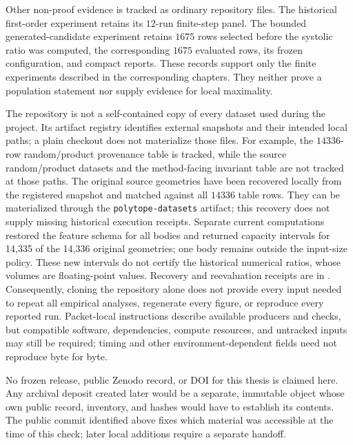 Other non-proof evidence is tracked as ordinary repository files. The
historical first-order experiment retains its
\(12\)-run finite-step panel.  The bounded generated-candidate experiment
retains \(1675\) rows selected before the systolic ratio was computed, the
corresponding \(1675\) evaluated rows, its frozen configuration, and compact
reports.  These records support only the finite experiments described in the
corresponding chapters.  They neither prove a population statement nor supply
evidence for local maximality.

The repository is not a self-contained copy of every dataset used during the
project.  Its artifact registry identifies external snapshots and their intended
local paths; a plain checkout does not materialize those files.  For example, the
\(14336\)-row random/product provenance table is tracked, while the source
random/product datasets and the method-facing invariant table are not tracked
at those paths. The original source geometries have been recovered locally
from the registered snapshot and matched against all \(14336\) table rows.
They can be materialized through the \texttt{polytope-datasets} artifact;
this recovery does not supply missing historical execution receipts.
Separate current computations restored the feature schema for all bodies and
returned capacity intervals for 14,335 of the 14,336 original geometries;
one body remains outside the input-size policy. These new intervals do not
certify the historical numerical ratios, whose volumes are floating-point
values. Recovery and reevaluation receipts are in
.
Consequently, cloning the repository alone does not provide every input needed
to repeat all empirical analyses, regenerate every figure, or reproduce every
reported run.  Packet-local instructions describe available producers and
checks, but compatible software, dependencies, compute resources, and
untracked inputs may still be required; timing and other
environment-dependent fields need not reproduce byte for byte.

No frozen release, public Zenodo record, or DOI for this thesis is claimed
here.  Any archival deposit created later would be a separate, immutable
object whose own public record, inventory, and hashes would have to establish
its contents.  The public commit identified above fixes which material was accessible
at the time of this check; later local additions require a separate handoff.

